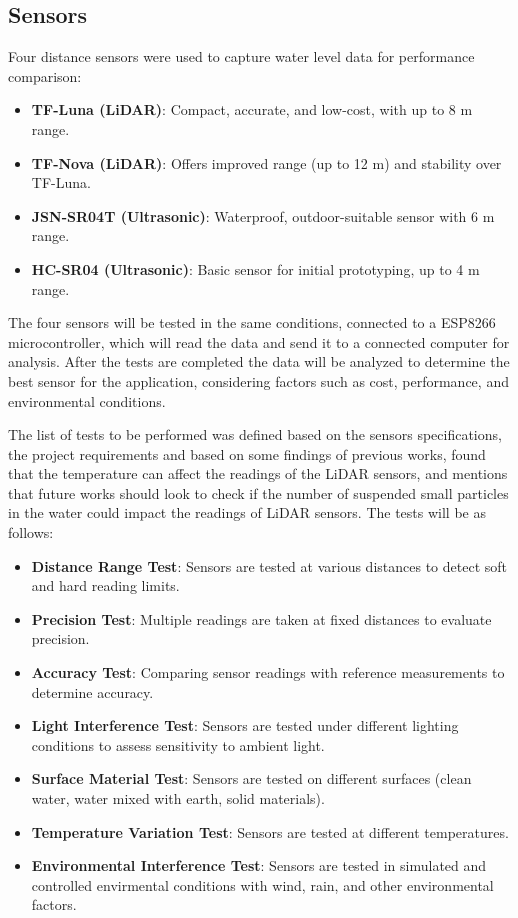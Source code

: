 \subsection{Sensors}
Four distance sensors were used to capture water level data for performance comparison:
\begin{itemize}
\item \textbf{TF-Luna (\gls{LiDAR})}: Compact, accurate, and low-cost, with up to 8 m range.
\item \textbf{TF-Nova (\gls{LiDAR})}: Offers improved range (up to 12 m) and stability over TF-Luna.
\item \textbf{JSN-SR04T (Ultrasonic)}: Waterproof, outdoor-suitable sensor with 6 m range.
\item \textbf{HC-SR04 (Ultrasonic)}: Basic sensor for initial prototyping, up to 4 m range.
\end{itemize}

The four sensors will be tested in the same conditions, connected to a ESP8266 microcontroller, which will read the data and send it to a connected computer for analysis. After the tests are completed the data will be analyzed to determine the best sensor for the application, considering factors such as cost, performance, and environmental conditions.

The list of tests to be performed was defined based on the sensors specifications, the project requirements and based on some findings of previous works, \cite{paul_2020_a} found that the temperature can affect the readings of the \gls{LiDAR} sensors, and \cite{tamari_2016_flash} mentions that future works should look  to check if the number of suspended small particles in the water could impact the readings of \gls{LiDAR} sensors. The tests will be as follows:

\begin{itemize}
    \item \textbf{Distance Range Test}: Sensors are tested at various distances to detect soft and hard reading limits.
     \item \textbf{Precision Test}: Multiple readings are taken at fixed distances to evaluate precision.
     \item \textbf{Accuracy Test}: Comparing sensor readings with reference measurements to determine accuracy.
     \item \textbf{Light Interference Test}: Sensors are tested under different lighting conditions to assess sensitivity to ambient light.
     \item \textbf{Surface Material Test}: Sensors are tested on different surfaces (clean water, water mixed with earth, solid materials).
     \item \textbf{Temperature Variation Test}: Sensors are tested at different temperatures.
     \item  \textbf{Environmental Interference Test}: Sensors are tested in simulated and controlled envirmental conditions with wind, rain, and other environmental factors.
\end{itemize}

